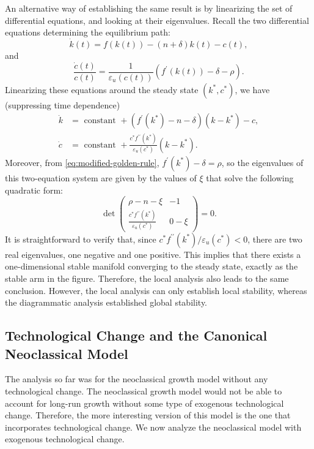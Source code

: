 \documentclass[\topdir/lecture\_notes.tex]{subfiles}
\begin{document}
An alternative way of establishing the same result is by linearizing the set of differential equations, and looking at their eigenvalues. Recall the two differential equations determining the equilibrium path:
\[
  \dot{k}(t)=f(k(t))-(n+\delta) k(t)-c(t),
\]
and
\[
  \frac{\dot{c}(t)}{c(t)}=\frac{1}{\varepsilon_{u}(c(t))}\left(f^{\prime}(k(t))-\delta-\rho\right).
\]
Linearizing these equations around the steady state $\left(k^{*}, c^{*}\right)$, we have (suppressing time dependence)
\[
  \begin{aligned}
    \dot{k} & =\text { constant }+\left(f^{\prime}\left(k^{*}\right)-n-\delta\right)\left(k-k^{*}\right)-c,                                \\
    \dot{c} & =\text { constant }+\frac{c^{*} f^{\prime \prime}\left(k^{*}\right)}{\varepsilon_{u}\left(c^{*}\right)}\left(k-k^{*}\right).
  \end{aligned}
\]
Moreover, from \eqref{eq:modified-golden-rule}, $f^{\prime}\left(k^{*}\right)-\delta=\rho$, so the eigenvalues of this two-equation system are given by the values of $\xi$ that solve the following quadratic form:
\[
  \operatorname{\det}\left(\begin{array}{cc}
      \rho-n-\xi                                                                          & -1    \\
      \frac{c^{*} f^{\prime \prime}\left(k^{*}\right)}{\varepsilon_{u}\left(c^{*}\right)} & 0-\xi
    \end{array}\right)=0.
\]
It is straightforward to verify that, since $c^{*} f^{\prime \prime}\left(k^{*}\right) / \varepsilon_{u}\left(c^{*}\right)<0$, there are two real eigenvalues, one negative and one positive. This implies that there exists a one-dimensional stable manifold converging to the steady state, exactly as the stable arm in the figure. Therefore, the local analysis also leads to the same conclusion. However, the local analysis can only establish local stability, whereas the diagrammatic analysis established global stability.

\subsection{Technological Change and the Canonical Neoclassical Model}
The analysis so far was for the neoclassical growth model without any technological change.
The neoclassical growth model would not be able to account for long-run growth without some type of exogenous technological change.
Therefore, the more interesting version of this model is the one that incorporates technological change.
We now analyze the neoclassical model with exogenous technological change.
\end{document}
